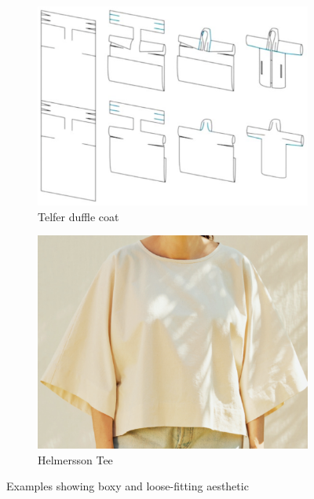 \begin{figure} [H]
    \centering
    \begin{subfigure}[b]{0.55\textwidth}
        \centering
        \includegraphics[width=\textwidth]{Images/rissanen jacket.png}
        \caption{Telfer duffle coat \cite{rissanen_zero-waste_2013}}
        \label{fig:rissanen_jacket}
    \end{subfigure}
    \hfill
    \begin{subfigure}[b]{0.4\textwidth}
        \centering
        \includegraphics[width=\textwidth]{Images/bh tee.png}
        \caption{Helmersson Tee \cite{helmersson_zero_2023}}
        \label{fig:bh_tee}
    \end{subfigure}
    \caption{Examples showing boxy and loose-fitting aesthetic}
    \label{fig:jacket_tee}
\end{figure}

